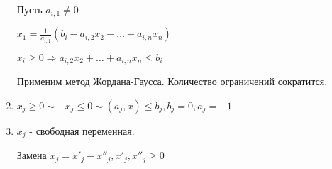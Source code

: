 \documentclass[11pt]{article}
\theoremstyle{break}
\begin{document}
\begin{sloppypar}
\begin{enumerate}
    Пусть $a_{i, 1} \neq 0$
    
    $x_1 = \frac{1}{a_{i, 1}}(b_i - a_{i, 2}x_2 - \dots - a_{i, n}x_n)$
    
    $x_i \geq 0 \Rightarrow a_{i, 2}x_2 + \dots + a_{i, n}x_n \leq b_i$
    
    Применим метод Жордана-Гаусса. Количество ограничений сократится.
    
  \item $x_j \geq 0 \sim - x_j \leq 0 \sim (a_j, x) \leq b_j, b_j = 0, a_j = -1$
  
  \item $x_j$ - свободная переменная.
  
    Замена $x_j = x'_j - x''_j, x'_j, x''_j \geq 0$
\end{enumerate}

\end{sloppypar}
\end{document}
